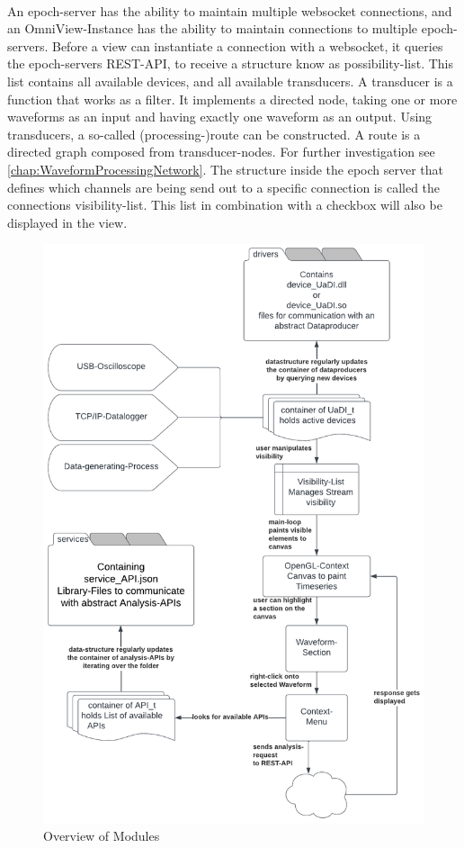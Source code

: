 \documentclass[]{scrreprt}
\begin{document}
\\
An epoch-server has the ability to maintain multiple websocket connections, and an OmniView-Instance has the ability to maintain connections to multiple epoch-servers.
Before a view can instantiate a connection with a websocket, it queries the epoch-servers REST-API, to receive a structure know as possibility-list.
This list contains all available devices, and all available transducers.
A transducer is a function that works as a filter.
It implements a directed node, taking one or more waveforms as an input and having exactly one waveform as an output.
Using transducers, a so-called (processing-)route can be constructed.
A route is a directed graph composed from transducer-nodes.
For further investigation see \ref{chap:WaveformProcessingNetwork}.
The structure inside the epoch server that defines which channels are being send out to a specific connection is called the connections visibility-list.
This list in combination with a checkbox will also be displayed in the view.


\begin{figure}
    \includegraphics[width=.9\textwidth]{./assets/pictures/overview.pdf}
    \caption{Overview of Modules}
    \label{fig:Overview}
\end{figure}
\end{document}
